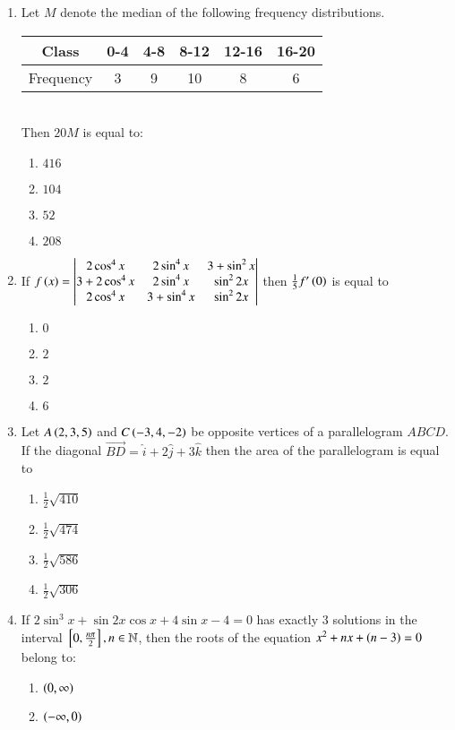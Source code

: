 \documentclass[journal]{IEEEtran}
\begin{document}
\begin{enumerate}
\item Let $M$ denote the median of the following frequency distributions.
\begin{tabular}{|c|c|c|c|c|c|}
	\hline 
 Class & 0-4 & 4-8 & 8-12 & 12-16 & 16-20 \\
		\hline
 Frequency & 3 & 9 & 10 & 8 & 6 \\
		\hline
	\end{tabular}\\
	Then $20 M$ is equal to:
		\begin{enumerate}
	\item $416$
	\item $104$
	\item $52$
	\item $208$
		\end{enumerate}
	\item If $f\left(x\right) = \begin{vmatrix}2\cos^4x & 2\sin^4x & 3+\sin^2x \\ 3+2\cos^4x & 2\sin^4x & \sin^22x \\ 2\cos^4x & 3+\sin^4x & \sin^22x\end{vmatrix}$ then $\frac{1}{5}f^{\prime}\left(0\right)$ is equal to 
		\begin{enumerate}
			\item $0$
			\item $2$
			\item $2$
			\item $6$
		\end{enumerate}
	\item Let $A\left(2, 3, 5\right)$ and $C\left(-3, 4, -2\right)$ be opposite vertices of a parallelogram $ABCD$. If the diagonal $\overrightarrow{BD} = \hat{i}+2\hat{j}+3\hat{k}$ then the area of the parallelogram is equal to
		\begin{enumerate}
			\item $\frac{1}{2}\sqrt{410}$
			\item $\frac{1}{2}\sqrt{474}$
			\item $\frac{1}{2}\sqrt{586}$
			\item $\frac{1}{2}\sqrt{306}$
		\end{enumerate}
	\item If $2\sin^3x + \sin 2x \cos x + 4\sin x - 4 = 0$ has exactly $3$ solutions in the interval ${}\left[0,\frac{n\pi}{2}\right], n \in \mathbb{N}$, then the roots of the equation $x^2+nx+\left(n-3\right)=0$ belong to:
		\begin{enumerate}
			\item $\left(0, \infty\right)$
			\item $\left(-\infty, 0\right)$

\end{enumerate}
\end{enumerate}
\end{document}
